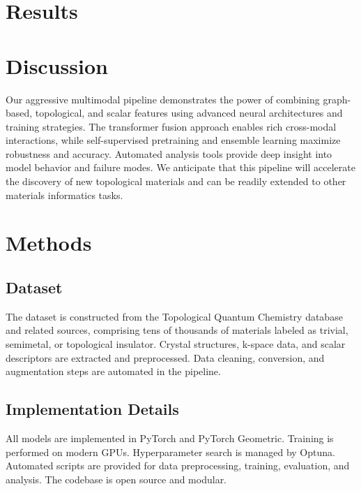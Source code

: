 \documentclass[12pt]{article}
\begin{document}
\section{Results}

\section{Discussion}
Our aggressive multimodal pipeline demonstrates the power of combining graph-based, topological, and scalar features using advanced neural architectures and training strategies. The transformer fusion approach enables rich cross-modal interactions, while self-supervised pretraining and ensemble learning maximize robustness and accuracy. Automated analysis tools provide deep insight into model behavior and failure modes. We anticipate that this pipeline will accelerate the discovery of new topological materials and can be readily extended to other materials informatics tasks.

\section{Methods}
\subsection{Dataset}
The dataset is constructed from the Topological Quantum Chemistry database and related sources, comprising tens of thousands of materials labeled as trivial, semimetal, or topological insulator. Crystal structures, k-space data, and scalar descriptors are extracted and preprocessed. Data cleaning, conversion, and augmentation steps are automated in the pipeline.

\subsection{Implementation Details}
All models are implemented in PyTorch and PyTorch Geometric. Training is performed on modern GPUs. Hyperparameter search is managed by Optuna. Automated scripts are provided for data preprocessing, training, evaluation, and analysis. The codebase is open source and modular.
\end{document}
